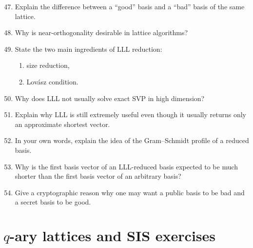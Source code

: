 \documentclass[11pt]{article}
\begin{document}
\begin{enumerate}
	\setcounter{enumi}{46}
	\item Explain the difference between a ``good'' basis and a ``bad'' basis of the same lattice.
	
	\item Why is near-orthogonality desirable in lattice algorithms?
	
	\item State the two main ingredients of LLL reduction:
	\begin{enumerate}
		\item size reduction,
		\item Lov\'asz condition.
	\end{enumerate}
	
	\item Why does LLL not usually solve exact SVP in high dimension?
	
	\item Explain why LLL is still extremely useful even though it usually returns only an approximate shortest vector.
	
	\item In your own words, explain the idea of the Gram--Schmidt profile of a reduced basis.
	
	\item Why is the first basis vector of an LLL-reduced basis expected to be much shorter than the first basis vector of an arbitrary basis?
	
	\item Give a cryptographic reason why one may want a public basis to be bad and a secret basis to be good.
\end{enumerate}

\section{\(q\)-ary lattices and SIS exercises}
\end{document}
